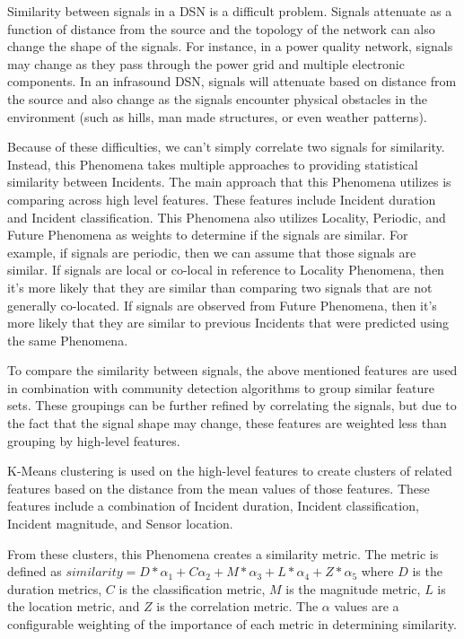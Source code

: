 Similarity between signals in a DSN is a difficult problem. Signals attenuate as a function of distance from the source and the topology of the network can also change the shape of the signals. For instance, in a power quality network, signals may change as they pass through the power grid and multiple electronic components. In an infrasound DSN, signals will attenuate based on distance from the source and also change as the signals encounter physical obstacles in the environment (such as hills, man made structures, or even weather patterns).

Because of these difficulties, we can't simply correlate two signals for similarity. Instead, this Phenomena takes multiple approaches to providing statistical similarity between Incidents. The main approach that this Phenomena utilizes is comparing across high level features. These features include Incident duration and Incident classification. This Phenomena also utilizes Locality, Periodic, and Future Phenomena as weights to determine if the signals are similar. For example, if signals are periodic, then we can assume that those signals are similar. If signals are local or co-local in reference to Locality Phenomena, then it's more likely that they are similar than comparing two signals that are not generally co-located. If signals are observed from Future Phenomena, then it's more likely that they are similar to previous Incidents that were predicted using the same Phenomena.

To compare the similarity between signals, the above mentioned features are used in combination with community detection algorithms to group similar feature sets. These groupings can be further refined by correlating the signals, but due to the fact that the signal shape may change, these features are weighted less than grouping by high-level features.

K-Means clustering is used on the high-level features to create clusters of related features based on the distance from the mean values of those features. These features include a combination of Incident duration, Incident classification, Incident magnitude, and Sensor location.

From these clusters, this Phenomena creates a similarity metric. The metric is defined as $similarity = D*\alpha_1 + C\alpha_2 + M*\alpha_3 + L*\alpha_4 + Z*\alpha_5$ where $D$ is the duration metrics, $C$ is the classification metric, $M$ is the magnitude metric, $L$ is the location metric, and $Z$ is the correlation metric. The $\alpha$ values are a configurable weighting of the importance of each metric in determining similarity.


